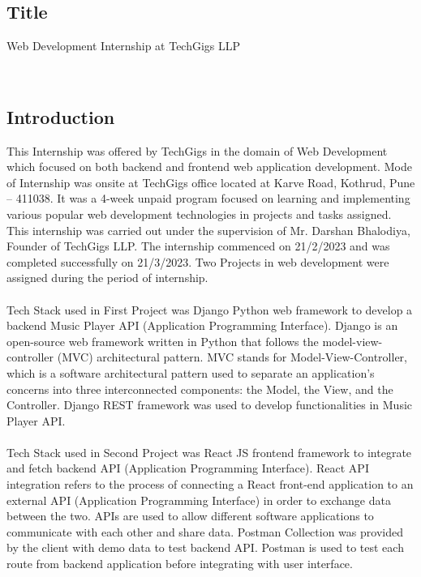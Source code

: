 \documentclass[a4paper, 12pt]{article}
\begin{document}
\begin{center}
    \section{Title}
    Web Development Internship at TechGigs LLP
\end{center}
\
\begin{center}
    \section{Introduction}
\end{center}
\hspace{10mm}This Internship was offered by TechGigs in the domain of Web Development which focused on both backend and frontend web application development. Mode of Internship was onsite at TechGigs office located at Karve Road, Kothrud, Pune – 411038. It was a 4-week unpaid program focused on learning and implementing various popular web development technologies in projects and tasks assigned. This internship was carried out under the supervision of Mr. Darshan Bhalodiya, Founder of TechGigs LLP. The internship commenced on 21/2/2023 and was completed successfully on 21/3/2023. Two Projects in web development were assigned during the period of internship. \\\\
\hspace*{10mm}Tech Stack used in First Project was Django Python web framework to develop a backend Music Player API (Application Programming Interface). Django is an open-source web framework written in Python that follows the model-view-controller (MVC) architectural pattern. MVC stands for Model-View-Controller, which is a software architectural pattern used to separate an application's concerns into three interconnected components: the Model, the View, and the Controller. Django REST framework was used to develop functionalities in Music Player API. \\\\
\hspace*{10mm}Tech Stack used in Second Project was React JS frontend framework to integrate and fetch backend API (Application Programming Interface). React API integration refers to the process of connecting a React front-end application to an external API (Application Programming Interface) in order to exchange data between the two. APIs are used to allow different software applications to communicate with each other and share data. Postman Collection was provided by the client with demo data to test backend API. Postman is used to test each route from backend application before integrating with user interface.\\\\
\newpage
\end{document}
